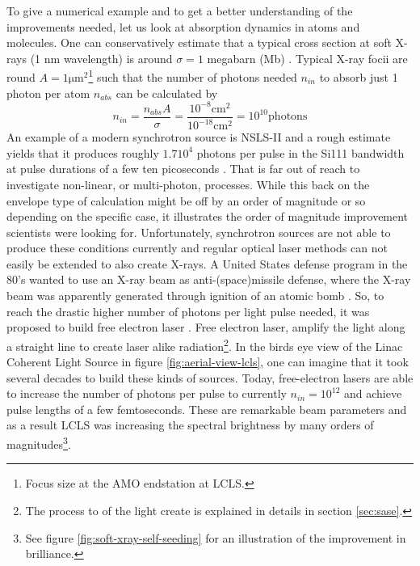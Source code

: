 To give a numerical example and to get a better understanding of the improvements needed, let us look at absorption dynamics in atoms and molecules. One can conservatively estimate that a typical cross section at soft X-rays (1 nm wavelength) is around $\sigma = 1$ megabarn (Mb) \cite{Bucksbaum-2011-Book}. Typical X-ray focii are round $A = 1 \mathrm{\mu m}^{2}$\footnote{Focus size at the AMO endstation at LCLS.} such that the number of photons needed $n_{in}$ to absorb just 1 photon per atom $n_{abs}$ can be calculated by
\begin{equation}
n_{in} = \frac{n_{abs} A}{\sigma} = \frac{10^{-8} \mathrm{cm}^{2}}{10^{-18} \mathrm{cm}^{2}}=10^{10} \mathrm{ photons}
\label{eq:absorption-cross-section}
\end{equation}
An example of a modern synchrotron source is NSLS-II and a rough estimate yields that it produces roughly $1.7 10^{4}$ photons per pulse in the Si111 bandwidth at pulse durations of a few ten picoseconds \cite{Williams-2016-PC}. That is far out of reach to investigate non-linear, or multi-photon, processes. While this back on the envelope type of calculation might be off by an order of magnitude or so depending on the specific case, it illustrates the order of magnitude improvement scientists were looking for. Unfortunately, synchrotron sources are not able to produce these conditions currently and regular optical laser methods can not easily be extended to also create X-rays. A United States defense program in the 80's wanted to use an X-ray beam as anti-(space)missile defense, where the X-ray beam was apparently generated through ignition of an atomic bomb \cite{Hecht-2008-OPN}. So, to reach the drastic higher number of photons per light pulse needed, it was proposed to build free electron laser \cite{Kondratenko-1980-PA,Bonifacio-1984-OC}. Free electron laser, amplify the light along a straight line to create laser alike radiation\footnote{The process to of the light create is explained in details in section \ref{sec:sase}.}. In the birds eye view of the Linac Coherent Light Source in figure \ref{fig:aerial-view-lcls}, one can imagine that it took several decades to build these kinds of sources. Today, free-electron lasers are able to increase the number of photons per pulse to currently $n_{in} = 10^{12}$ and achieve pulse lengths of a few femtoseconds. These are remarkable beam parameters and as a result LCLS was increasing the spectral brightness by many orders of magnitudes\footnote{See figure \ref{fig:soft-xray-self-seeding} for an illustration of the improvement in brilliance.}.
